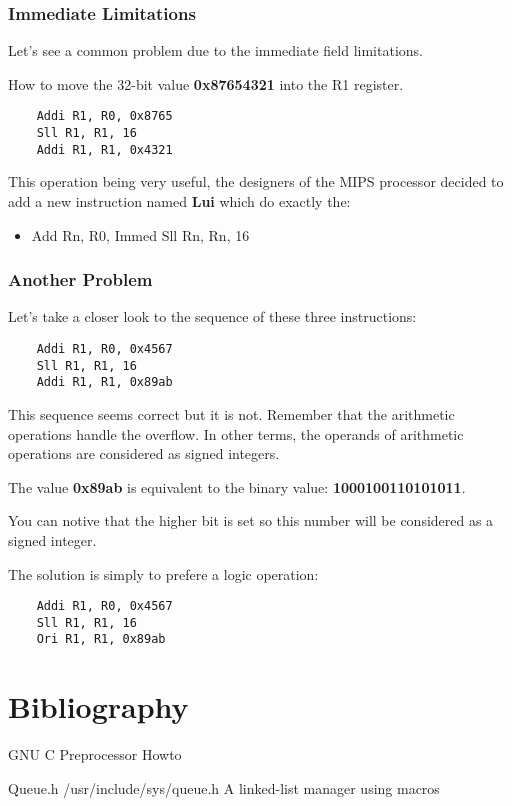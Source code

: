 \begin{frame}[containsverbatim]
  \frametitle{Immediate Limitations}

  Let's see a common problem due to the immediate field limitations.

  \nl

  How to move the 32-bit value \textbf{0x87654321} into the R1 register.

  \begin{verbatim}
    Addi R1, R0, 0x8765
    Sll R1, R1, 16
    Addi R1, R1, 0x4321
  \end{verbatim}

  This operation being very useful, the designers of the MIPS processor
  decided to add a new instruction named \textbf{Lui} which do
  exactly the:

  \begin{itemize}
    \item
      Add Rn, R0, Immed
      Sll Rn, Rn, 16
  \end{itemize}
\end{frame}


\begin{frame}
  \frametitle{Another Problem}

  Let's take a closer look to the sequence of these three instructions:

  \begin{verbatim}
    Addi R1, R0, 0x4567
    Sll R1, R1, 16
    Addi R1, R1, 0x89ab
  \end{verbatim}

  This sequence seems correct but it is not. Remember that the arithmetic
  operations handle the overflow. In other terms, the operands of
  arithmetic operations are considered as signed integers.

  \nl

  The value \textbf{0x89ab} is equivalent to the binary value:
  \textbf{1000100110101011}.

  \nl

  You can notive that the higher bit is set so this number will be considered
  as a signed integer.

  \nl

  The solution is simply to prefere a logic operation:

  \begin{verbatim}
    Addi R1, R0, 0x4567
    Sll R1, R1, 16
    Ori R1, R1, 0x89ab
  \end{verbatim}
\end{frame}

%
%

\section{Bibliography}

\begin{thebibliography}{3}

    GNU C Preprocessor Howto

    Queue.h
    \newblock /usr/include/sys/queue.h
    \newblock A linked-list manager using macros
\end{thebibliography}


